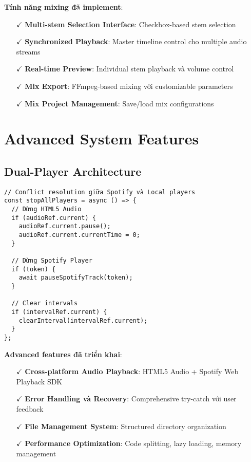 \documentclass[12pt,a4paper]{article}
\begin{document}
\textbf{Tính năng mixing đã implement}:
\begin{itemize}
\item[$\checkmark$] \textbf{Multi-stem Selection Interface}: Checkbox-based stem selection
\item[$\checkmark$] \textbf{Synchronized Playback}: Master timeline control cho multiple audio streams
\item[$\checkmark$] \textbf{Real-time Preview}: Individual stem playback và volume control
\item[$\checkmark$] \textbf{Mix Export}: FFmpeg-based mixing với customizable parameters
\item[$\checkmark$] \textbf{Mix Project Management}: Save/load mix configurations
\end{itemize}

\section{Advanced System Features}

\subsection{Dual-Player Architecture}

\begin{lstlisting}[caption={Conflict resolution giữa Spotify và Local players}]
// Conflict resolution giữa Spotify và Local players
const stopAllPlayers = async () => {
  // Dừng HTML5 Audio
  if (audioRef.current) {
    audioRef.current.pause();
    audioRef.current.currentTime = 0;
  }
  
  // Dừng Spotify Player
  if (token) {
    await pauseSpotifyTrack(token);
  }
  
  // Clear intervals
  if (intervalRef.current) {
    clearInterval(intervalRef.current);
  }
};
\end{lstlisting}

\textbf{Advanced features đã triển khai}:
\begin{itemize}
\item[$\checkmark$] \textbf{Cross-platform Audio Playback}: HTML5 Audio + Spotify Web Playback SDK
\item[$\checkmark$] \textbf{Error Handling và Recovery}: Comprehensive try-catch với user feedback
\item[$\checkmark$] \textbf{File Management System}: Structured directory organization
\item[$\checkmark$] \textbf{Performance Optimization}: Code splitting, lazy loading, memory management
\end{itemize}
\end{document}
